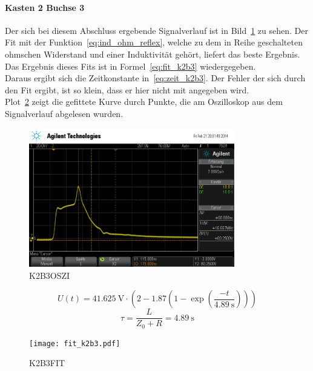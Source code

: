 \paragraph{Kasten 2 Buchse 3}
Der sich bei diesem Abschluss ergebende Signalverlauf ist in 
Bild~\ref{fig:k2b3} zu sehen. Der Fit mit der 
Funktion~\eqref{eq:ind_ohm_reflex}, welche zu dem in Reihe geschalteten 
ohmschen Widerstand und einer Induktivität gehört, liefert das 
beste Ergebnis. Das Ergebnis dieses Fits ist in 
Formel~\eqref{eq:fit_k2b3} wiedergegeben.\\
Daraus ergibt sich die Zeitkonstante in~\eqref{eq:zeit_k2b3}.
Der Fehler der sich durch den Fit ergibt, ist so klein, dass er hier 
nicht mit angegeben wird.\\
Plot~\ref{fig:fit_k2b3} zeigt die gefittete Kurve durch Punkte, die 
am Oszilloskop aus dem Signalverlauf abgelesen wurden.\\
%
\begin{figure}[]
\centering
\includegraphics[width=0.8\textwidth]{k2b3.png}
\caption{K2B3OSZI}
\label{fig:k2b3}
\end{figure}
%
\begin{equation}
U(t) = \SI{41.625}{\volt}\cdot\left(2 - 
1.87\left(1-\exp{\left(\frac{-t}{\SI{4.89}{\second}}\right)}
\right)\right)
\label{eq:fit_k2b3}
\end{equation}
%
\begin{equation}
\tau = \frac{L}{Z_0 + R} = \SI{4.89}{\second}
\label{eq:zeit_k2b3}
\end{equation}
%
\begin{figure}[]
\centering
\texttt{[image: fit\_k2b3.pdf]}
\caption{K2B3FIT}
\label{fig:fit_k2b3}
\end{figure}
%
\FloatBarrier
%
